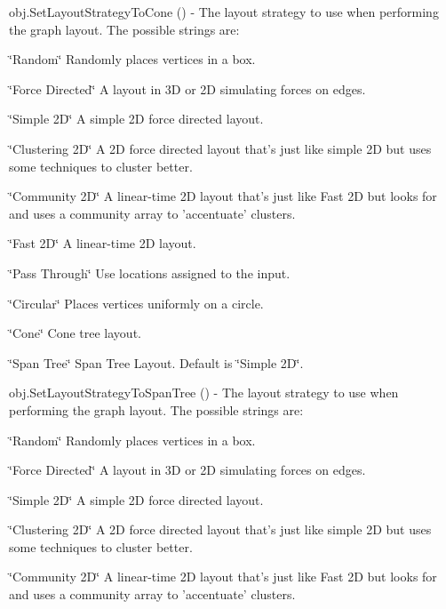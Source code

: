 \begin{DoxyItemize}
\begin{DoxyItemize}
\end{DoxyItemize}
\item {\ttfamily obj.\-Set\-Layout\-Strategy\-To\-Cone ()} -\/ The layout strategy to use when performing the graph layout. The possible strings are\-:
\begin{DoxyItemize}
\item \char`\"{}\-Random\char`\"{} Randomly places vertices in a box.
\item \char`\"{}\-Force Directed\char`\"{} A layout in 3\-D or 2\-D simulating forces on edges.
\item \char`\"{}\-Simple 2\-D\char`\"{} A simple 2\-D force directed layout.
\item \char`\"{}\-Clustering 2\-D\char`\"{} A 2\-D force directed layout that's just like simple 2\-D but uses some techniques to cluster better.
\item \char`\"{}\-Community 2\-D\char`\"{} A linear-\/time 2\-D layout that's just like Fast 2\-D but looks for and uses a community array to 'accentuate' clusters.
\item \char`\"{}\-Fast 2\-D\char`\"{} A linear-\/time 2\-D layout.
\item \char`\"{}\-Pass Through\char`\"{} Use locations assigned to the input.
\item \char`\"{}\-Circular\char`\"{} Places vertices uniformly on a circle.
\item \char`\"{}\-Cone\char`\"{} Cone tree layout.
\item \char`\"{}\-Span Tree\char`\"{} Span Tree Layout. Default is \char`\"{}\-Simple 2\-D\char`\"{}.  
\end{DoxyItemize}
\item {\ttfamily obj.\-Set\-Layout\-Strategy\-To\-Span\-Tree ()} -\/ The layout strategy to use when performing the graph layout. The possible strings are\-:
\begin{DoxyItemize}
\item \char`\"{}\-Random\char`\"{} Randomly places vertices in a box.
\item \char`\"{}\-Force Directed\char`\"{} A layout in 3\-D or 2\-D simulating forces on edges.
\item \char`\"{}\-Simple 2\-D\char`\"{} A simple 2\-D force directed layout.
\item \char`\"{}\-Clustering 2\-D\char`\"{} A 2\-D force directed layout that's just like simple 2\-D but uses some techniques to cluster better.
\item \char`\"{}\-Community 2\-D\char`\"{} A linear-\/time 2\-D layout that's just like Fast 2\-D but looks for and uses a community array to 'accentuate' clusters.

\end{DoxyItemize}
\end{DoxyItemize}

